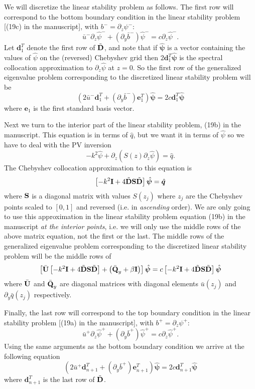 \documentclass[10pt]{article}
\newcommand{\pd}[1]{\partial_{#1}}
\newcommand{\mat}[1]{\text{\bf #1}}
\begin{document}
We will discretize the linear stability problem as follows.
The first row will correspond to the bottom boundary condition in the linear stability problem [(19c) in the manuscript], with $b^-=\pd{z}\psi^-$: 
\[\bar{u}^-\pd{z}\hat{\psi}^-+(\pd{y}\bar{b}^-)\hat{\psi}^- = c\pd{z}\hat{\psi}^-.\]
Let $\bm{d}_1^T$ denote the first row of $\tilde{\mat{D}}$, and note that if $\hat{\bm{\psi}}$ is a vector containing the values of $\hat{\psi}$ on the (reversed) Chebyshev grid then $2\bm{d}_1^T\hat{\bm{\psi}}$ is the spectral collocation approximation to $\pd{z}\hat{\psi}$ at $z=0$.
So the first row of the generalized eigenvalue problem corresponding to the discretized linear stability problem will be
\[(2\bar{u}^-\bm{d}_1^T+(\pd{y}\bar{b}^-)\bm{e}_1^T)\hat{\bm{\psi}} = 2c\bm{d}_1^T\hat{\bm{\psi}}\]
where $\bm{e}_1$ is the first standard basis vector.

Next we turn to the interior part of the linear stability problem, (19b) in the manuscript.
This equation is in terms of $\hat{q}$, but we want it in terms of $\hat{\psi}$ so we have to deal with the PV inversion
\[-k^2\hat{\psi} + \pd{z}\left(S(z)\pd{z}\hat{\psi}\right) = \hat{q}.\]
The Chebyshev collocation approximation to this equation is
\[\left[-k^2\mat{I}+4\tilde{\mat{D}}\mat{S}\tilde{\mat{D}}\right]\hat{\bm{\psi}} = \hat{\bm{q}}\]
where $\mat{S}$ is a diagonal matrix with values $S(z_j)$ where $z_j$ are the Chebyshev points scaled to $[0,1]$ and reversed (i.e. in {\it ascending} order).
We are only going to use this approximation in the linear stability problem equation (19b) in the manuscript {\it at the interior points}, i.e. we will only use the middle rows of the above matrix equation, not the first or the last.
The middle rows of the generalized eigenvalue problem corresponding to the discretized linear stability problem will be the middle rows of 
\[\left[\bar{\mat{U}}\left[-k^2\mat{I}+4\tilde{\mat{D}}\mat{S}\tilde{\mat{D}}\right] +\left(\bar{\mat{Q}}_y+\beta\mat{I}\right)\right]\hat{\bm{\psi}} = c\left[-k^2\mat{I}+4\tilde{\mat{D}}\mat{S}\tilde{\mat{D}}\right]\hat{\bm{\psi}}\]
where $\bar{\mat{U}}$ and $\bar{\mat{Q}}_y$ are diagonal matrices with diagonal elements $\bar{u}(z_j)$ and $\pd{y}\bar{q}(z_j)$ respectively.

Finally, the last row will correspond to the top boundary condition in the linear stability problem [(19a) in the manuscript], with $b^+=\pd{z}\psi^+$: 
\[\bar{u}^+\pd{z}\hat{\psi}^++(\pd{y}\bar{b}^+)\hat{\psi}^+ = c\pd{z}\hat{\psi}^+.\]
Using the same arguments as the bottom boundary condition we arrive at the following equation
\[(2\bar{u}^+\bm{d}_{n+1}^T+(\pd{y}\bar{b}^+)\bm{e}_{n+1}^T)\hat{\bm{\psi}} = 2c\bm{d}_{n+1}^T\hat{\bm{\psi}}\]
where $\bm{d}_{n+1}^T$ is the last row of $\tilde{\mat{D}}$.
\end{document}
